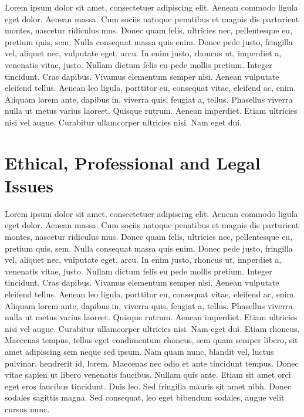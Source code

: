 Lorem ipsum dolor sit amet, consectetuer adipiscing elit. Aenean commodo ligula eget dolor. Aenean massa. Cum sociis natoque penatibus et magnis dis parturient montes, nascetur ridiculus mus. Donec quam felis, ultricies nec, pellentesque eu, pretium quis, sem. Nulla consequat massa quis enim. Donec pede justo, fringilla vel, aliquet nec, vulputate eget, arcu. In enim justo, rhoncus ut, imperdiet a, venenatis vitae, justo. Nullam dictum felis eu pede mollis pretium. Integer tincidunt. Cras dapibus. Vivamus elementum semper nisi. Aenean vulputate eleifend tellus. Aenean leo ligula, porttitor eu, consequat vitae, eleifend ac, enim. Aliquam lorem ante, dapibus in, viverra quis, feugiat a, tellus. Phasellus viverra nulla ut metus varius laoreet. Quisque rutrum. Aenean imperdiet. Etiam ultricies nisi vel augue. Curabitur ullamcorper ultricies nisi. Nam eget dui. 

\section{Ethical, Professional and Legal Issues}

Lorem ipsum dolor sit amet, consectetuer adipiscing elit. Aenean commodo ligula eget dolor. Aenean massa. Cum sociis natoque penatibus et magnis dis parturient montes, nascetur ridiculus mus. Donec quam felis, ultricies nec, pellentesque eu, pretium quis, sem. Nulla consequat massa quis enim. Donec pede justo, fringilla vel, aliquet nec, vulputate eget, arcu. In enim justo, rhoncus ut, imperdiet a, venenatis vitae, justo. Nullam dictum felis eu pede mollis pretium. Integer tincidunt. Cras dapibus. Vivamus elementum semper nisi. Aenean vulputate eleifend tellus. Aenean leo ligula, porttitor eu, consequat vitae, eleifend ac, enim. Aliquam lorem ante, dapibus in, viverra quis, feugiat a, tellus. Phasellus viverra nulla ut metus varius laoreet. Quisque rutrum. Aenean imperdiet. Etiam ultricies nisi vel augue. Curabitur ullamcorper ultricies nisi. Nam eget dui. Etiam rhoncus. Maecenas tempus, tellus eget condimentum rhoncus, sem quam semper libero, sit amet adipiscing sem neque sed ipsum. Nam quam nunc, blandit vel, luctus pulvinar, hendrerit id, lorem. Maecenas nec odio et ante tincidunt tempus. Donec vitae sapien ut libero venenatis faucibus. Nullam quis ante. Etiam sit amet orci eget eros faucibus tincidunt. Duis leo. Sed fringilla mauris sit amet nibh. Donec sodales sagittis magna. Sed consequat, leo eget bibendum sodales, augue velit cursus nunc.

